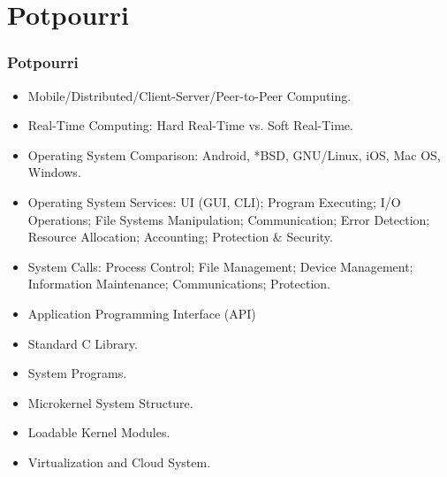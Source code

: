 \documentclass[aspectratio=169, xcolor=table, notheorems, hyperref={pdfpagelabels=false}]{beamer}
\begin{document}
\section{Potpourri}
\begin{frame}
\frametitle{Potpourri}
\begin{itemize}
\item Mobile/Distributed/Client-Server/Peer-to-Peer Computing.
\item Real-Time Computing: Hard Real-Time vs. Soft Real-Time.
\item Operating System Comparison: 
Android, 
*BSD,
GNU/Linux, 
iOS, 
Mac OS, 
Windows.
\item Operating System Services: UI (GUI, CLI); Program Executing; I/O Operations; 
      File Systems Manipulation; Communication; Error Detection; Resource Allocation;
      Accounting; Protection \& Security.
\item System Calls: Process Control; File Management; Device Management; Information
      Maintenance; Communications; Protection.
\item Application Programming Interface (API)
\item Standard C Library.
\item System Programs.
\item Microkernel System Structure.
\item Loadable Kernel Modules.
\item Virtualization and Cloud System.
\end{itemize}
\end{frame}

\end{document}
